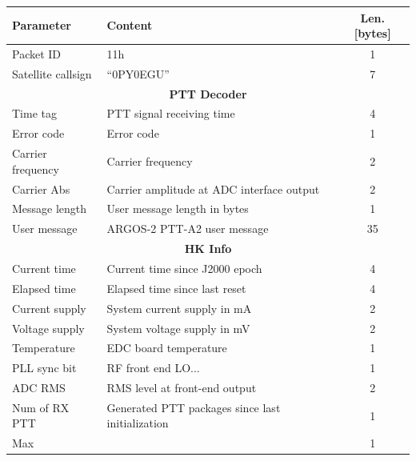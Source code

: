 \begin{table}[!h]
    \centering
    \begin{tabular}{llc}
        \toprule[1.5pt]
        \textbf{Parameter} & \textbf{Content}                                 & \textbf{Len. [bytes]} \\
        \midrule
        Packet ID          & 11h                                              & 1 \\
        Satellite callsign & ``0PY0EGU''                                      & 7 \\
        \midrule
        \multicolumn{3}{c}{\textbf{PTT Decoder}} \\
        \midrule
        Time tag           & PTT signal receiving time                        & 4 \\
        Error code         & Error code                                       & 1 \\
        Carrier frequency  & Carrier frequency                                & 2 \\
        Carrier Abs        & Carrier amplitude at ADC interface output        & 2 \\
        Message length     & User message length in bytes                     & 1 \\
        User message       & ARGOS-2 PTT-A2 user message                      & 35 \\
        \midrule
        \multicolumn{3}{c}{\textbf{HK Info}} \\
        \midrule
        Current time       & Current time since J2000 epoch                   & 4 \\
        Elapsed time       & Elapsed time since last reset                    & 4 \\
        Current supply     & System current supply in mA                      & 2 \\
        Voltage supply     & System voltage supply in mV                      & 2 \\
        Temperature        & EDC board temperature                            & 1 \\
        PLL sync bit       & RF front end LO...                               & 1 \\
        ADC RMS            & RMS level at front-end output                    & 2 \\
        Num of RX PTT      & Generated PTT packages since last initialization & 1 \\
        Max                &                                                  & 1 \\

\end{tabular}
\end{table}
